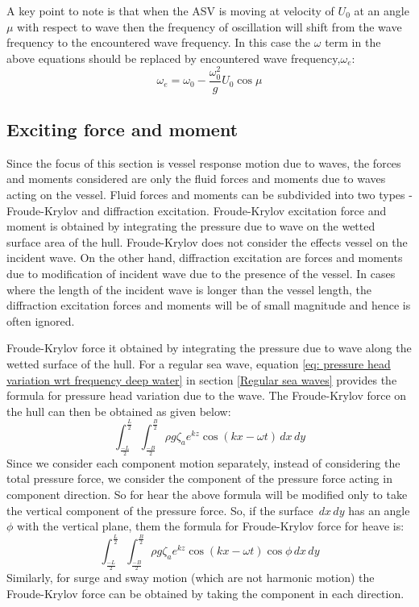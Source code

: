 A key point to note is that when the ASV is moving at velocity of $U_0$ at an
angle $\mu$ with respect to wave then the frequency of oscillation will shift
from the wave frequency to the encountered wave frequency. In this case the
$\omega$ term in the above equations should be replaced by encountered wave
frequency,$\omega_e$:
\begin{equation}
  \omega_e = \omega_0 - \frac{\omega_0^2}{g} U_0 \cos \mu 
  \label{eq: encountered wave frequency }  
\end{equation}

\subsection{Exciting force and moment}
\label{Exciting force and moment}

Since the focus of this section is vessel response motion due to waves, the
forces and moments considered are only the fluid forces and moments due to waves
acting on the vessel. Fluid forces and moments can be subdivided into two types
- Froude-Krylov and diffraction excitation. Froude-Krylov excitation force and
moment is obtained by integrating the pressure due to wave on the wetted surface
area of the hull. Froude-Krylov does not consider the effects vessel on the
incident wave. On the other hand, diffraction excitation are forces and moments
due to modification of incident wave due to the presence of the vessel. In cases
where the length of the incident wave is longer than the vessel length, the
diffraction excitation forces and moments will be of small magnitude and hence
is often ignored. 

Froude-Krylov force it obtained by integrating the pressure due to wave along
the wetted surface of the hull. For a regular sea wave, equation \ref{eq:
pressure head variation wrt frequency deep water} in section \ref{Regular sea
waves} provides the formula for pressure head variation due to the wave. The
Froude-Krylov force on the hull can then be obtained as given below:
\begin{equation}
  \int_{\frac{-L}{2}}^{\frac{L}{2}} 
  \int_{\frac{-B}{2}}^{\frac{B}{2}} 
  \rho g \zeta_a e^{k z} \cos (k x - \omega t) 
  \,dx \,dy 
\end{equation}
Since we consider each component motion separately, instead of considering the
total pressure force, we consider the component of the pressure force acting in
component direction. So for hear the above formula will be modified only to take
the vertical component of the pressure force. So, if the surface $\,dx \,dy$ has
an angle $\phi$ with the vertical plane, them the formula for Froude-Krylov
force for heave is: 
\begin{equation}
  \int_{\frac{-L}{2}}^{\frac{L}{2}} 
  \int_{\frac{-B}{2}}^{\frac{B}{2}} 
  \rho g \zeta_a e^{k z} \cos (k x - \omega t) \cos \phi 
  \,dx \,dy 
\end{equation}  
Similarly, for surge and sway motion (which are not harmonic motion) the
Froude-Krylov force can be obtained by taking the component in each direction.

